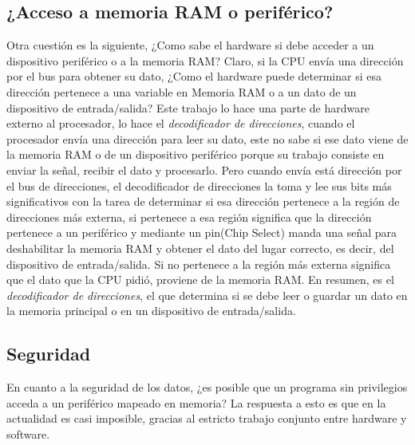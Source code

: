 \documentclass[12pt, a4paper]{article}
\begin{document}
\subsection{¿Acceso a memoria RAM o periférico?}
Otra cuestión es la siguiente, ¿Como sabe el hardware si debe acceder a un dispositivo periférico o a la memoria RAM? Claro, si la CPU envía una dirección por el bus para obtener su dato, ¿Como el hardware puede determinar si esa dirección pertenece a una variable en Memoria RAM o a un dato de un dispositivo de entrada/salida? Este trabajo lo hace una parte de hardware externo al procesador, lo hace el \textit{decodificador de direcciones}, cuando el procesador envía una dirección para leer su dato, este no sabe si ese dato viene de la memoria RAM o de un dispositivo periférico porque su trabajo consiste en enviar la señal, recibir el dato y procesarlo. Pero cuando envía está dirección por el bus de direcciones, el decodificador de direcciones la toma y lee sus bits más significativos con la tarea de determinar si esa dirección pertenece a la región de direcciones más externa, si pertenece a esa región significa que la dirección pertenece a un periférico y mediante un pin(Chip Select) manda una señal para deshabilitar la memoria RAM y obtener el dato del lugar correcto, es decir, del dispositivo de entrada/salida. Si no pertenece a la región más externa significa que el dato que la CPU pidió, proviene de la memoria RAM. En resumen, es el \textit{decodificador de direcciones}, el que determina si se debe leer o guardar un dato en la memoria principal o en un dispositivo de entrada/salida.

\subsection{Seguridad}
En cuanto a la seguridad de los datos, ¿es posible que un programa sin privilegios acceda a un periférico mapeado en memoria? La respuesta a esto es que en la actualidad es casi imposible, gracias al estricto trabajo conjunto entre hardware y software. 
\end{document}
